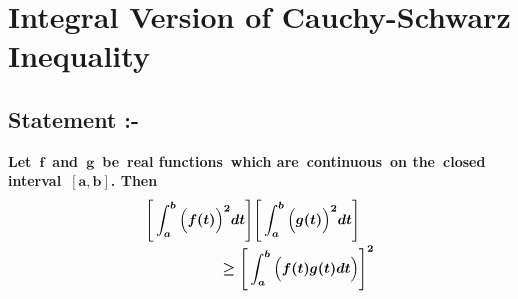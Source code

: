 \documentclass[12pt]{article}
\begin{document}
  \pagebreak 

\section{Integral Version of Cauchy-Schwarz Inequality}

\vspace*{3cm}

\subsection{Statement :-}


\Large{\textbf{Let }$\boldsymbol{f}$\textbf{ and }$\boldsymbol{g}$\textbf{ be real functions which are continuous on the closed interval }$\boldsymbol{[a,b]}$\textbf{. Then}} \LARGE{\[ \boldsymbol{\splitdfrac{  \displaystyle{  \Bigg[\int_a^b \Big( f (t)\Big)^2dt\Bigg] \Bigg[\int_a^b \Big( g (t)\Big)^2dt\Bigg]  } }{ \displaystyle{  \geq \Bigg[\int_a^b \Big(f (t)g (t)dt\Big)\Bigg]^2  } }}\]}
\end{document}
